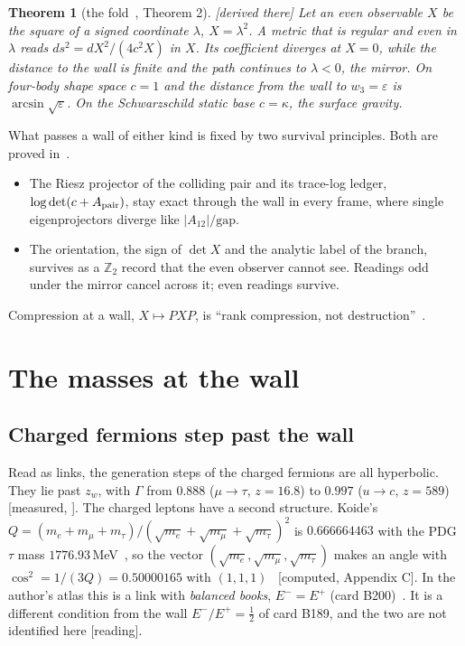 \documentclass[11pt]{article}
\newtheorem{theorem}{Theorem}\newtheorem{proposition}[theorem]{Proposition}\newtheorem{lemma}[theorem]{Lemma}
\theoremstyle{definition}\newtheorem{hypothesis}{Hypothesis}\newtheorem{prediction}{Prediction}
\theoremstyle{remark}\newtheorem{remark}[theorem]{Remark}
\newcommand{\grade}[1]{\textsf{\small[#1]}}
\begin{document}
\begin{theorem}[the fold~\cite{BH}, Theorem 2]\label{thm:fold}\grade{derived there}
Let an even observable $X$ be the square of a signed coordinate $\lambda$, $X=\lambda^2$. A metric that is regular and even in $\lambda$ reads $ds^2=dX^2/(4c^2X)$ in $X$. Its coefficient diverges at $X=0$, while the distance to the wall is finite and the path continues to $\lambda<0$, the mirror. On four-body shape space $c=1$ and the distance from the wall to $w_3=\varepsilon$ is $\arcsin\sqrt\varepsilon$. On the Schwarzschild static base $c=\kappa$, the surface gravity.
\end{theorem}

What passes a wall of either kind is fixed by two survival principles. Both are proved in~\cite{BH}.
\begin{itemize}[nosep]
\item The Riesz projector of the colliding pair and its trace-log ledger, $\log\det(c+A_{\rm pair})$, stay exact through the wall in every frame, where single eigenprojectors diverge like $|A_{12}|/\mathrm{gap}$.
\item The orientation, the sign of $\det X$ and the analytic label of the branch, survives as a $\mathbb Z_2$ record that the even observer cannot see. Readings odd under the mirror cancel across it; even readings survive.
\end{itemize}
Compression at a wall, $X\mapsto PXP$, is ``rank compression, not destruction''~\cite{BH}.

\section{The masses at the wall}\label{sec:masses}

\subsection{Charged fermions step past the wall}
Read as links, the generation steps of the charged fermions are all hyperbolic. They lie past $z_w$, with $\Gamma$ from $0.888$ ($\mu\to\tau$, $z=16.8$) to $0.997$ ($u\to c$, $z=589$) \grade{measured, \cite{SMball}}. The charged leptons have a second structure. Koide's $Q=(m_e+m_\mu+m_\tau)/(\sqrt{m_e}+\sqrt{m_\mu}+\sqrt{m_\tau})^2$ is $0.666664463$ with the PDG $\tau$ mass $1776.93$\,MeV~\cite{PDG}, so the vector $(\sqrt{m_e},\sqrt{m_\mu},\sqrt{m_\tau})$ makes an angle with $\cos^2=1/(3Q)=0.50000165$ with $(1,1,1)$~\cite{Koide} \grade{computed, Appendix C}. In the author's atlas this is a link with \emph{balanced books}, $E^-=E^+$ (card B200)~\cite{Atlas}. It is a different condition from the wall $E^-/E^+=\tfrac12$ of card B189, and the two are not identified here \grade{reading}.
\end{document}
